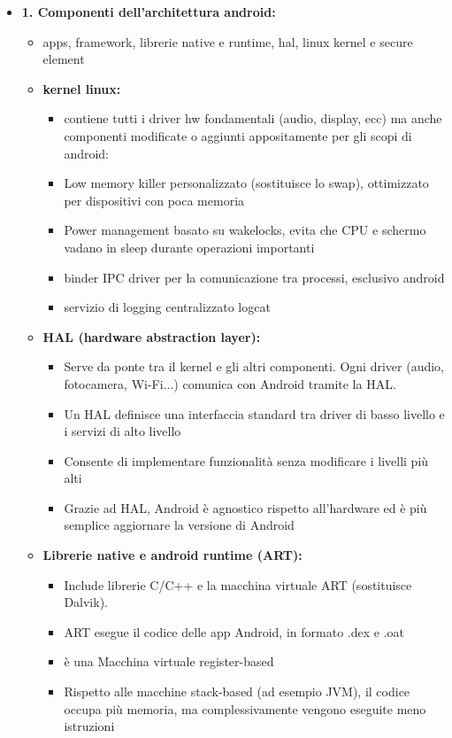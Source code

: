 \documentclass{report}
\begin{document}
\begin{itemize}
\item \textbf{1. Componenti dell'architettura android:}
\begin{itemize}
    \item apps, framework, librerie native e runtime, hal, linux kernel e secure element
    \item \textbf{kernel linux:}
    \begin{itemize}
        \item contiene tutti i driver hw fondamentali (audio, display, ecc) ma anche componenti modificate o aggiunti appositamente per gli scopi di android:
        \item Low memory killer personalizzato (sostituisce lo swap), ottimizzato per dispositivi con poca memoria
        \item Power management basato su wakelocks, evita che CPU e schermo vadano in sleep durante operazioni importanti
        \item binder IPC driver per la comunicazione tra processi, esclusivo android
        \item servizio di logging centralizzato logcat
    \end{itemize}
    \item \textbf{HAL (hardware abstraction layer):}
    \begin{itemize}
        \item Serve da ponte tra il kernel e gli altri componenti. Ogni driver (audio, fotocamera, Wi-Fi...) comunica con Android tramite la HAL.
        \item Un HAL definisce una interfaccia standard tra driver di basso livello e i servizi di alto livello
        \item Consente di implementare funzionalit\`a senza modificare i livelli pi\`u alti
        \item Grazie ad HAL, Android \`e agnostico rispetto all’hardware ed \`e pi\`u semplice aggiornare la versione di Android
    \end{itemize}
    \item \textbf{Librerie native e android runtime (ART):}
    \begin{itemize}
        \item Include librerie C/C++ e la macchina virtuale ART (sostituisce Dalvik).
        \item ART esegue il codice delle app Android, in formato .dex e .oat
        \item \`e una Macchina virtuale register-based
        \item Rispetto alle macchine stack-based (ad esempio JVM), il codice occupa pi\`u memoria, ma complessivamente vengono eseguite meno istruzioni

\end{itemize}
\end{itemize}
\end{itemize}
\end{document}
